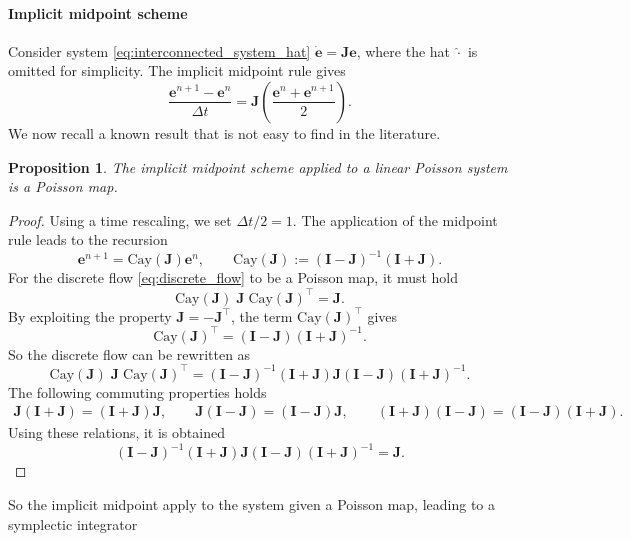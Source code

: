 \documentclass[11pt,a4paper]{article}
\newtheorem{proof}{Proof}
\newtheorem{proposition}{Proposition}
\begin{document}
{\paragraph{Implicit midpoint scheme}
Consider system \eqref{eq:interconnected_system_hat} $\dot{\mathbf{e}} = {\mathbf{J}}{\mathbf{e}}$, where the hat $\widehat{\cdot}$ is omitted for simplicity. The implicit midpoint rule gives
    $$
     \frac{{\mathbf{e}}^{n+1}-{\mathbf{e}}^n}{\Delta t} = {\mathbf{J}} \left(\frac{{\mathbf{e}}^n + {\mathbf{e}}^{n+1}}{2}\right).
    $$
We now recall a known result that is not easy to find in the literature.
\begin{proposition}
The implicit midpoint scheme applied to a linear Poisson system is a Poisson map.
\end{proposition}
\begin{proof}
    Using a time rescaling, we set $\Delta t/2 = 1$. 
    The application of the midpoint rule leads to the recursion 
    \begin{equation}\label{eq:discrete_flow}
        {\mathbf{e}}^{n+1} = \mathrm{Cay}({\mathbf{J}}) {\mathbf{e}}^{n}, \qquad  \mathrm{Cay}({\mathbf{J}}) := (\mathbf{I} -{\mathbf{J}})^{-1}(\mathbf{I} + {\mathbf{J}}).
    \end{equation}
    For the discrete flow \eqref{eq:discrete_flow} to be a Poisson map, it must hold
    $$
    \mathrm{Cay}({\mathbf{J}}) \; \mathbf{J} \; \mathrm{Cay}({\mathbf{J}})^\top = \mathbf{J}.
    $$
    By exploiting the property $\mathbf{J} = -\mathbf{J}^\top$, the term $\mathrm{Cay}({\mathbf{J}})^\top$ gives
    $$
    \mathrm{Cay}({\mathbf{J}})^\top = (\mathbf{I} -{\mathbf{J}})(\mathbf{I} + {\mathbf{J}})^{-1}.
    $$
    So the discrete flow can be rewritten as
    $$
    \mathrm{Cay}({\mathbf{J}}) \; \mathbf{J} \; \mathrm{Cay}({\mathbf{J}})^\top =  (\mathbf{I} -{\mathbf{J}})^{-1}(\mathbf{I} + {\mathbf{J}}) \mathbf{J} (\mathbf{I} -{\mathbf{J}})(\mathbf{I} + {\mathbf{J}})^{-1}.
    $$
    The following commuting properties holds
    \begin{equation}\label{eq:commutation_matrices}
        \begin{aligned}
            \mathbf{J}(\mathbf{I} + \mathbf{J}) = (\mathbf{I} + \mathbf{J}) \mathbf{J}, \qquad
            \mathbf{J}(\mathbf{I} - \mathbf{J}) = (\mathbf{I} - \mathbf{J}) \mathbf{J}, \qquad
            (\mathbf{I} + \mathbf{J})(\mathbf{I} - \mathbf{J}) = (\mathbf{I} - \mathbf{J})(\mathbf{I} + \mathbf{J}).            
        \end{aligned}
    \end{equation}
    Using these relations, it is obtained
    $$
    (\mathbf{I} -{\mathbf{J}})^{-1}(\mathbf{I} + {\mathbf{J}}) \mathbf{J} (\mathbf{I} -{\mathbf{J}})(\mathbf{I} + {\mathbf{J}})^{-1} = \mathbf{J}.
    $$
\end{proof}
So the implicit midpoint apply to the system given a Poisson map, leading to a symplectic integrator
}
\end{document}
